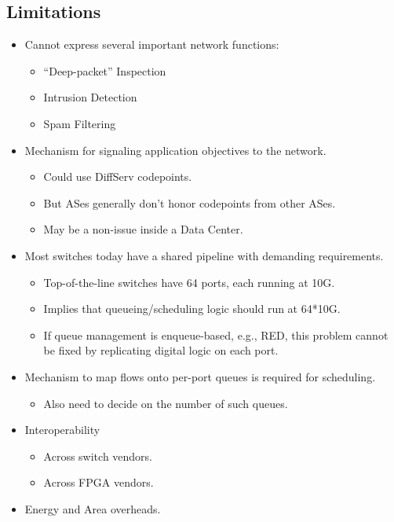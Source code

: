{\begin{multicols}{2}
\section*{Limitations}
\begin{itemize}
\item Cannot express several important network functions:
      \begin{itemize}
      \item ``Deep-packet'' Inspection
      \item Intrusion Detection
      \item Spam Filtering
      \end{itemize}
\item Mechanism for signaling application objectives to the network.
      \begin{itemize}
      \item Could use DiffServ codepoints.
      \item But ASes generally don't honor codepoints from other ASes.
      \item May be a non-issue inside a Data Center.
      \end{itemize}
\item Most switches today have a shared pipeline with demanding requirements.
      \begin{itemize}
      \item Top-of-the-line switches have 64 ports, each running at 10G.
      \item Implies that queueing/scheduling logic should run at 64*10G.
      \item If queue management is enqueue-based, e.g., RED, this problem cannot be fixed by replicating digital logic on each port.
      \end{itemize}
\item Mechanism to map flows onto per-port queues is required for scheduling.
      \begin{itemize}
      \item Also need to decide on the number of such queues.
      \end{itemize}
\item Interoperability
      \begin{itemize}
      \item Across switch vendors.
      \item Across FPGA vendors.
      \end{itemize}
\item Energy and Area overheads.
\end{itemize}

\end{multicols}
}
